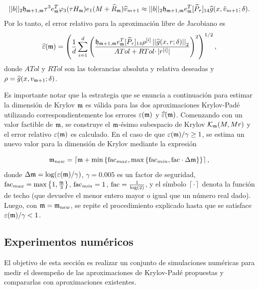 \begin{equation*}
||b||_2 \mathfrak{h}_{\mathfrak{m}+1,\mathfrak{m}}\tau^3 e_{\mathfrak{m}}^T\varphi_3(\tau H_{\mathfrak{m}})e_1(M+\widehat{R}_{\mathfrak{m}})\widehat{v}_{m+1} \approx ||b||_2 \mathfrak{h}_{\mathfrak{m}+1,\mathfrak{m}} e_{\mathfrak{m}}^T[\widetilde{P}_{\tau}]_{14} \widehat{g}(x,\hat{v}_{m+1};\delta).
\end{equation*}
Por lo tanto, el error relativo para la aproximación libre de Jacobiano es
\begin{equation*}
	\widehat{\varepsilon}(\mathfrak{m}) = \left(\frac{1}{d}\sum\limits_{i=1}^{d} \left(\frac{
		\mathfrak{h}_{\mathfrak{m}+1,\mathfrak{m}} e_{\mathfrak{m}}^T
		[\widetilde{P}_\tau]_{14} \rho^{[i]} \left\lvert \left\lvert \widehat{g}(x,r;\delta) \right\rvert \right\rvert_2}{ATol+ RTol\cdotp
		\rvert r^{[i]}\rvert}\right)^{2}\right)^{1/2},
\end{equation*}
donde $ATol$ y $RTol$ son las tolerancias absoluta y relativa deseadas y $\rho = \widehat{g}(x,v_{\mathfrak{m}+1};\delta)$. 


 Es importante notar que la estrategia que se enuncia a continuación para estimar la dimensión de Krylov $\mathfrak{m}$ es válida para las dos aproximaciones Krylov-Padé utilizando correspondientemente los errores $\varepsilon(\mathfrak{m})$ y $\widehat{\varepsilon}(\mathfrak{m})$.	Comenzando con un valor factible de $\mathfrak{m}$, se construye el $\mathfrak{m}$-ésimo subespacio de Krylov $\mathcal{K}_{\mathfrak{m}}(M,Mr)$ y el error relativo $\varepsilon(\mathfrak{m})$ es calculado. En el caso de que $\varepsilon(\mathfrak{m})/\gamma \geq 1$, se estima un nuevo valor para la dimensión de Krylov mediante la expresión

\begin{equation} \label{eq:m-new}
\mathfrak{m}_{new} = \left\lceil \mathfrak{m} + \min\left\{ \mathrm{fac}_{max} , \max\left\{ \mathrm{fac}_{min},
		\mathrm{fac}\cdot\Delta\mathfrak{m} \right\}  \right\} \right\rceil,
\end{equation}
donde $\Delta\mathfrak{m}=\log(\varepsilon(\mathfrak{m})/\gamma)$, $\gamma=0.005$ es un factor de seguridad, $\mathrm{fac}_{max}= \max\left\{  1, \frac{\mathfrak{m}}{3}  \right\}$, $\mathrm{fac}_{min}= 1 $, $\mathrm{fac}=\frac{1}{\log(2)}$, y el símbolo $\left\lceil \cdot \right\rceil$ denota la función de techo (que devuelve el menor entero mayor o igual que un número real dado). Luego, con $\mathfrak{m}=\mathfrak{m}_{new}$, se repite el procedimiento explicado hasta que se satisface $\varepsilon(\mathfrak{m})/\gamma< 1$.

\subsection{Experimentos numéricos}\label{section:num-sim-kp}
El objetivo de esta sección es realizar un conjunto de simulaciones numéricas para medir el desempeño de las aproximaciones de Krylov-Padé propuestas y compararlas con aproximaciones existentes.


